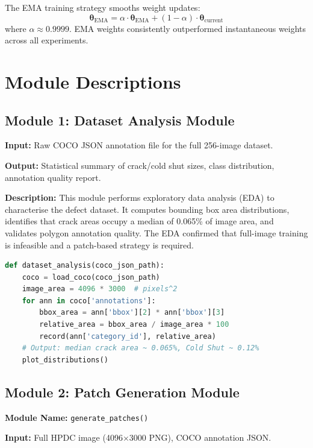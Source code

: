The EMA training strategy smooths weight updates:
\begin{equation}
\boldsymbol{\theta}_{\text{EMA}} = \alpha \cdot \boldsymbol{\theta}_{\text{EMA}} + (1-\alpha) \cdot \boldsymbol{\theta}_{\text{current}}
\end{equation}
where $\alpha \approx 0.9999$. EMA weights consistently outperformed instantaneous weights across all experiments.

\section{Module Descriptions}

\subsection{Module 1: Dataset Analysis Module}

\textbf{Input:} Raw COCO JSON annotation file for the full 256-image dataset.

\textbf{Output:} Statistical summary of crack/cold shut sizes, class distribution, annotation quality report.

\textbf{Description:} This module performs exploratory data analysis (EDA) to characterise the defect dataset. It computes bounding box area distributions, identifies that crack areas occupy a median of 0.065\% of image area, and validates polygon annotation quality. The EDA confirmed that full-image training is infeasible and a patch-based strategy is required.

\begin{lstlisting}[language=Python, caption={Dataset analysis pseudocode}]
def dataset_analysis(coco_json_path):
    coco = load_coco(coco_json_path)
    image_area = 4096 * 3000  # pixels^2
    for ann in coco['annotations']:
        bbox_area = ann['bbox'][2] * ann['bbox'][3]
        relative_area = bbox_area / image_area * 100
        record(ann['category_id'], relative_area)
    # Output: median crack area ~ 0.065%, Cold Shut ~ 0.12%
    plot_distributions()
\end{lstlisting}

\subsection{Module 2: Patch Generation Module}

\textbf{Module Name:} \texttt{generate\_patches()}

\textbf{Input:} Full HPDC image (4096$\times$3000 PNG), COCO annotation JSON.

